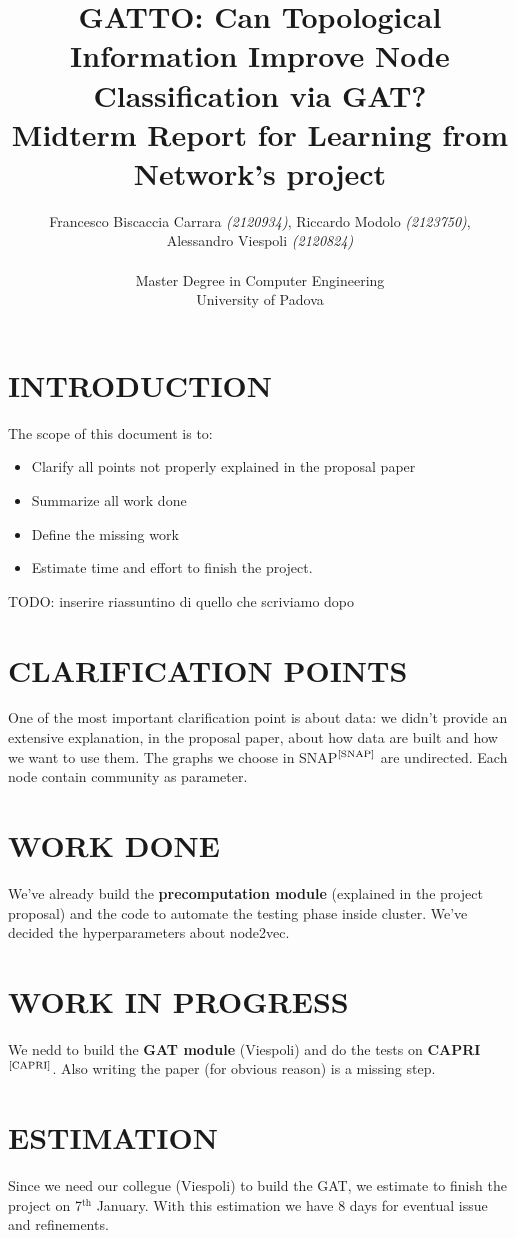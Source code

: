 \documentclass[12pt,conference]{ieeeconf} %
\title{GATTO: Can Topological Information Improve Node Classification via GAT?\\
\large Midterm Report for Learning from Network's project \\}
\author{Francesco Biscaccia Carrara \textit{(2120934)}, Riccardo Modolo \textit{(2123750)},\\ Alessandro Viespoli \textit{(2120824)} %
\\\\ Master Degree in Computer Engineering \\
University of Padova \\
}
\begin{document}
\maketitle
\thispagestyle{plain}
\pagestyle{plain}

\section{INTRODUCTION} 
The scope of this document is to:
\begin{itemize}
    \item Clarify all points not properly explained in the proposal paper
    \item Summarize all work done
    \item Define the missing work 
    \item Estimate time and effort to finish the project.
\end{itemize}

TODO: inserire riassuntino di quello che scriviamo dopo

\section{CLARIFICATION POINTS}
One of the most important clarification point is about data: we didn't provide an extensive explanation, in the proposal paper, about how data are built and how we want to use them.
The graphs we choose in SNAP$^\text{\cite{SNAP}}$ are undirected. Each node contain community as parameter. 

\section{WORK DONE}
We've already build the \textbf{precomputation module} (explained in the project proposal) 
and the code to automate the testing phase inside cluster. We've decided the hyperparameters
about node2vec.

\section{WORK IN PROGRESS}
We nedd to build the \textbf{GAT module} (Viespoli) and do the tests on \textbf{CAPRI}$^\text{\cite{CAPRI}}$.
Also writing the paper (for obvious reason) is a missing step. 

\section{ESTIMATION}
Since we need our collegue (Viespoli) to build the GAT, we estimate to finish the project on 7$^{\text{th}}$ January.
With this estimation we have 8 days for eventual issue and refinements.
\vspace{\fill}
\printbibliography
\end{document}
